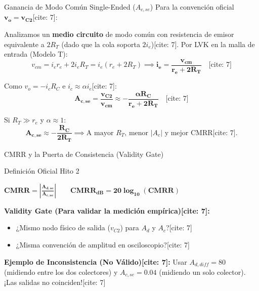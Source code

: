 \documentclass[aspectratio=169]{beamer}
\begin{document}
\begin{frame}{Ganancia de Modo Común Single-Ended ($A_{c,se}$)}
    Para la convención oficial $\mathbf{v_o = v_{C2}}$[cite: 7]:
    
    Analizamos un \textbf{medio circuito} de modo común con resistencia de emisor equivalente a $2R_T$ (dado que la cola soporta $2i_e$)[cite: 7].
    Por LVK en la malla de entrada (Modelo T):
    \begin{equation*}
        v_{cm} = i_e r_e + 2 i_e R_T = i_e (r_e + 2R_T) \implies \mathbf{i_e = \frac{v_{cm}}{r_e + 2R_T}} \quad \text{[cite: 7]}
    \end{equation*}
    
    Como $v_o = -i_c R_C$ e $i_c \approx \alpha i_e$[cite: 7]:
    \begin{equation*}
        \mathbf{A_{c,se} = \frac{v_{C2}}{v_{cm}} \approx -\frac{\alpha R_C}{r_e + 2R_T}} \quad \text{[cite: 7]}
    \end{equation*}
    
    Si $R_T \gg r_e$ y $\alpha \approx 1$:
    \begin{equation*}
        \mathbf{A_{c,se} \approx -\frac{R_C}{2R_T}} \implies \text{A mayor } R_T \text{, menor } |A_c| \text{ y mejor CMRR[cite: 7].}
    \end{equation*}
\end{frame}

\begin{frame}{CMRR y la Puerta de Consistencia (Validity Gate)}
    \begin{alertblock}{Definición Oficial Hito 2}
        \begin{center}
            $\displaystyle \mathbf{CMRR = \left|\frac{A_{d,se}}{A_{c,se}}\right|} \qquad \mathbf{CMRR_{dB} = 20\log_{10}(CMRR)}$ \quad \text{[cite: 7]}
        \end{center}
    \end{alertblock}
    
    \vspace{0.2cm}
    \textbf{Validity Gate (Para validar la medición empírica)[cite: 7]:}
    \begin{itemize}
        \item ¿Mismo nodo físico de salida ($v_{C2}$) para $A_d$ y $A_c$?[cite: 7]
        \item ¿Misma convención de amplitud en osciloscopio?[cite: 7]
    \end{itemize}
    
    \textbf{Ejemplo de Inconsistencia (No Válido)[cite: 7]:}
    Usar $A_{d,diff} = 80$ (midiendo entre los dos colectores) y $A_{c,se} = 0.04$ (midiendo un solo colector). ¡Las salidas no coinciden![cite: 7]
\end{frame}
\end{document}
